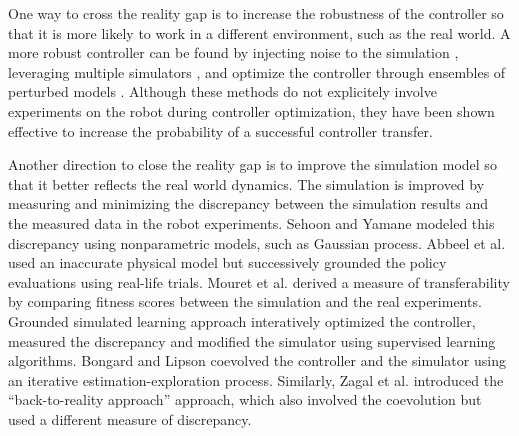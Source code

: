 One way to cross the reality gap is to increase the robustness of the controller so that it is more likely to work in a different environment, such as the real world. A more robust controller can be found by injecting noise to the simulation \cite{Miglino94,Jakobi95,Miglino96}, leveraging multiple simulators \cite{Boeing:2012}, and optimize the controller through ensembles of perturbed models \cite{Mordatch:2015}. Although these methods do not explicitely involve experiments on the robot during controller optimization, they have been shown effective to increase the probability of a successful controller transfer.

Another direction to close the reality gap is to improve the simulation model so that it better reflects the real world dynamics. The simulation is improved by measuring and minimizing the discrepancy between the simulation results and the measured data in the robot experiments. Sehoon and Yamane \cite{HA:2015} modeled this discrepancy using nonparametric models, such as Gaussian process. Abbeel et al. \cite{Abbeel:2006} used an inaccurate physical model but successively grounded the policy evaluations using real-life trials. Mouret et al. \cite{MouretKD13, Koos:2010} derived a measure of transferability by comparing fitness scores between the simulation and the real experiments. Grounded simulated learning approach \cite{Farchy:2013} interatively optimized the controller, measured the discrepancy and modified the simulator using supervised learning algorithms. Bongard and Lipson \cite{BongardL05} coevolved the controller and the simulator using an iterative estimation-exploration process. Similarly, Zagal et al. \cite{zagal2004} introduced the ``back-to-reality approach'' approach, which also involved the coevolution but used a different measure of discrepancy.
